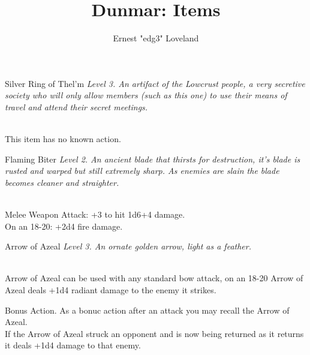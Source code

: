\documentclass[10pt,twoside,twocolumn]{article}
\title{Dunmar: Items}
\author{Ernest "edg3" Loveland}
\begin{document}
\selectfont %

\maketitle
\tableofcontents

\begin{itembox}{Silver Ring of Thel'm}
	\textit{Level 3. An artifact of the Lowcrust people, a very secretive society who will only allow members (such as this one) to use their means of travel and attend their secret meetings.}\\
	\hline \\[1mm]
	\begin{itemaction}[None.]
		This item has no known action.
	\end{itemaction}
\end{itembox}

\begin{itembox}{Flaming Biter}
	\textit{Level 2. An ancient blade that thirsts for destruction, it's blade is rusted and warped but still extremely sharp. As enemies are slain the blade becomes cleaner and straighter.}\\
	\hline \\[1mm]
	\begin{itemaction}[Attack.]
		Melee Weapon Attack: +3 to hit 1d6+4 damage. \\
		
		On an 18-20: +2d4 fire damage. \\
	\end{itemaction}
\end{itembox}

\begin{itembox}{Arrow of Azeal}
	\textit{Level 3. An ornate golden arrow, light as a feather.}\\
	\hline \\[1mm]
	\begin{itemaction}[Use.]
		Arrow of Azeal can be used with any standard bow attack, on an 18-20 Arrow of Azeal deals +1d4 radiant damage to the enemy it strikes. \\
	\end{itemaction}
	\begin{itemaction}[Recall.]
		Bonus Action. As a bonuc action after an attack you may recall the Arrow of Azeal. \\
		
		If the Arrow of Azeal struck an opponent and is now being returned as it returns it deals +1d4 damage to that enemy.
	\end{itemaction}
\end{itembox}

\end{document}
